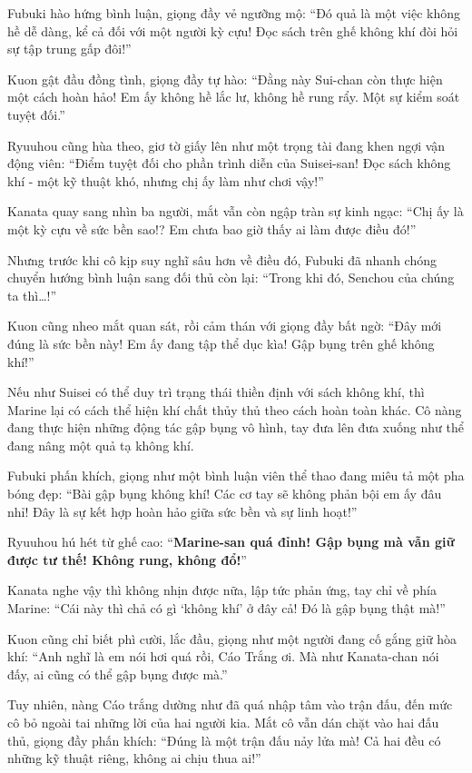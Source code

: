 \documentclass[../main.tex]{subfiles}
\begin{document}
Fubuki hào hứng bình luận, giọng đầy vẻ ngưỡng mộ: ``Đó quả là một việc không hề dễ dàng, kể cả đối với một người kỳ cựu! Đọc sách trên ghế không khí đòi hỏi sự tập trung gấp đôi!''

Kuon gật đầu đồng tình, giọng đầy tự hào: ``Đằng này Sui-chan còn thực hiện một cách hoàn hảo! Em ấy không hề lắc lư, không hề rung rẩy. Một sự kiểm soát tuyệt đối.''

Ryuuhou cũng hùa theo, giơ tờ giấy lên như một trọng tài đang khen ngợi vận động viên: ``Điểm tuyệt đối cho phần trình diễn của Suisei-san! Đọc sách không khí - một kỹ thuật khó, nhưng chị ấy làm như chơi vậy!''

Kanata quay sang nhìn ba người, mắt vẫn còn ngập tràn sự kinh ngạc: ``Chị ấy là một kỳ cựu về sức bền sao!? Em chưa bao giờ thấy ai làm được điều đó!''

Nhưng trước khi cô kịp suy nghĩ sâu hơn về điều đó, Fubuki đã nhanh chóng chuyển hướng bình luận sang đối thủ còn lại: ``Trong khi đó, Senchou của chúng ta thì\dots!''

Kuon cũng nheo mắt quan sát, rồi cảm thán với giọng đầy bất ngờ: ``Đây mới đúng là sức bền này! Em ấy đang tập thể dục kìa! Gập bụng trên ghế không khí!''


Nếu như Suisei có thể duy trì trạng thái thiền định với sách không khí, thì Marine lại có cách thể hiện khí chất thủy thủ theo cách hoàn toàn khác. Cô nàng đang thực hiện những động tác gập bụng vô hình, tay đưa lên đưa xuống như thể đang nâng một quả tạ không khí.

Fubuki phấn khích, giọng như một bình luận viên thể thao đang miêu tả một pha bóng đẹp: ``Bài gập bụng không khí! Các cơ tay sẽ không phản bội em ấy đâu nhỉ! Đây là sự kết hợp hoàn hảo giữa sức bền và sự linh hoạt!''

Ryuuhou hú hét từ ghế cao: ``\textbf{Marine-san quá đỉnh! Gập bụng mà vẫn giữ được tư thế! Không rung, không đổ!}''

Kanata nghe vậy thì không nhịn được nữa, lập tức phản ứng, tay chỉ về phía Marine: ``Cái này thì chả có gì `không khí' ở đây cả! Đó là gập bụng thật mà!''

Kuon cũng chỉ biết phì cười, lắc đầu, giọng như một người đang cố gắng giữ hòa khí: ``Anh nghĩ là em nói hơi quá rồi, Cáo Trắng ơi. Mà như Kanata-chan nói đấy, ai cũng có thể gập bụng được mà.''

Tuy nhiên, nàng Cáo trắng dường như đã quá nhập tâm vào trận đấu, đến mức cô bỏ ngoài tai những lời của hai người kia. Mắt cô vẫn dán chặt vào hai đấu thủ, giọng đầy phấn khích: ``Đúng là một trận đấu nảy lửa mà! Cả hai đều có những kỹ thuật riêng, không ai chịu thua ai!''
\end{document}

